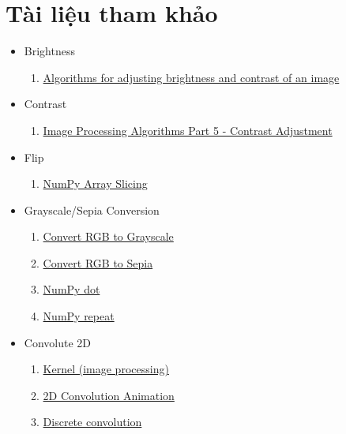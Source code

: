 \documentclass[]{article}
\begin{document}
\section{Tài liệu tham khảo}
\begin{itemize}
  \item Brightness
  \begin{enumerate}
    \item \href{https://ie.nitk.ac.in/blog/2020/01/19/algorithms-for-adjusting-brightness-and-contrast-of-an-image/}{Algorithms for adjusting brightness and contrast of an image}
  \end{enumerate}
  \item Contrast
  \begin{enumerate}
      \item \href{https://www.dfstudios.co.uk/articles/programming/image-programming-algorithms/image-processing-algorithms-part-5-contrast-adjustment/}{Image Processing Algorithms Part 5 - Contrast Adjustment}
  \end{enumerate}
  \item Flip
  \begin{enumerate}
      \item \href{https://www.w3schools.com/python/numpy/numpy_array_slicing.asp}{NumPy Array Slicing}
  \end{enumerate}
  \item Grayscale/Sepia Conversion
  \begin{enumerate}
    \item \href{https://www.tutorialspoint.com/dip/grayscale_to_rgb_conversion.htm}{Convert RGB to Grayscale}
    \item \href{https://www.geeksforgeeks.org/image-processing-in-java-colored-image-to-sepia-image-conversion/}{Convert RGB to Sepia}
    \item \href{https://numpy.org/doc/stable/reference/generated/numpy.dot.html}{NumPy dot}
    \item \href{https://numpy.org/doc/stable/reference/generated/numpy.repeat.html}{NumPy repeat}
  \end{enumerate}
  \item Convolute 2D
  \begin{enumerate}
    \item \href{https://en.wikipedia.org/wiki/Kernel\_(image\_processing)}{Kernel (image processing)}
    \item \href{https://en.wikipedia.org/wiki/File:2D_Convolution_Animation.gif}{2D Convolution Animation}
    \item \href{https://en.wikipedia.org/wiki/Convolution#Discrete_convolution}{Discrete convolution}

\end{enumerate}
\end{itemize}
\end{document}
